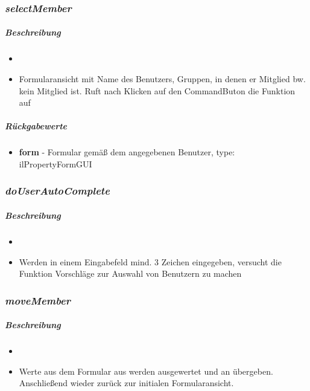 \subsubsection*{\textit{selectMember}}\label{selectMemberMGUI}
\subparagraph{Beschreibung}
\begin{itemize}
	\item[] \noindent{} 
	\item[] Formularansicht mit Name des Benutzers, Gruppen, in denen er Mitglied bw. kein Mitglied ist. Ruft nach Klicken auf den CommandButon die Funktion  auf
\end{itemize}
\subparagraph{Rückgabewerte}
\begin{itemize}
	\item[] \textbf{form} - Formular gemäß dem angegebenen Benutzer, type: ilPropertyFormGUI
\end{itemize}

\subsubsection*{\textit{doUserAutoComplete}}\label{doUserAutoCompleteMGUI}
\subparagraph{Beschreibung}
\begin{itemize}
	\item[] \noindent{} 
	\item[] Werden in einem Eingabefeld mind. 3 Zeichen eingegeben, versucht die Funktion Vorschläge zur Auswahl von Benutzern zu machen
\end{itemize}

\subsubsection*{\textit{moveMember}}\label{moveMemberMGUI}
\subparagraph{Beschreibung}
\begin{itemize}
	\item[] \noindent{} 
	\item[] Werte aus dem Formular aus  werden ausgewertet und an  übergeben. Anschließend wieder zurück zur initialen Formularansicht.
\end{itemize}

